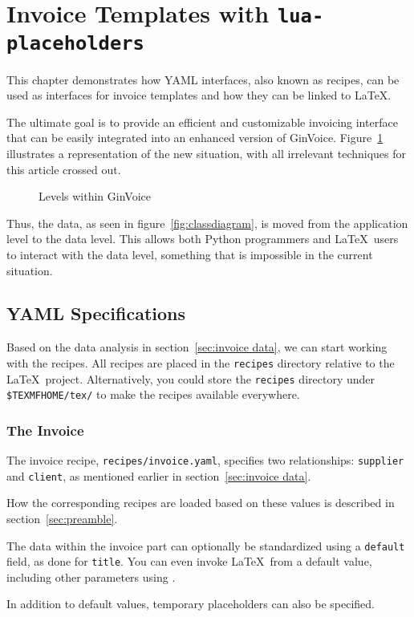 \section{Invoice Templates with \texttt{lua-placeholders}}\label{sec:new situation}
This chapter demonstrates how YAML interfaces, also known as recipes, can be used as interfaces for invoice templates and how they can be linked to \LaTeX.

The ultimate goal is to provide an efficient and customizable invoicing interface that can be easily integrated into an enhanced version of GinVoice.
Figure~\ref{fig:scope-bd} illustrates a representation of the new situation, with all irrelevant techniques for this article crossed out.

\begin{figure}[!ht]
    \centering
    
    \caption{Levels within GinVoice}\label{fig:scope-bd}
\end{figure}

Thus, the data, as seen in figure~\ref{fig:classdiagram}, is moved from the application level to the data level.
This allows both Python programmers and \LaTeX\ users to interact with the data level, something that is impossible in the current situation.

\subsection{YAML Specifications}
Based on the data analysis in section~\ref{sec:invoice data}, we can start working with the recipes.
All recipes are placed in the \texttt{recipes} directory relative to the \LaTeX\ project.
Alternatively, you could store the \texttt{recipes} directory under \texttt{\$TEXMFHOME/tex/} to make the recipes available everywhere.

\subsubsection{The Invoice}
The invoice recipe, \texttt{recipes/invoice.yaml}, specifies two relationships: \texttt{supplier} and \texttt{client}, as mentioned earlier in section~\ref{sec:invoice data}.

How the corresponding recipes are loaded based on these values is described in section~\ref{sec:preamble}.

The data within the invoice part can optionally be standardized using a \texttt{default} field, as done for \texttt{title}.
You can even invoke \LaTeX\ from a default value, including other parameters using .

In addition to default values, temporary placeholders can also be specified.


